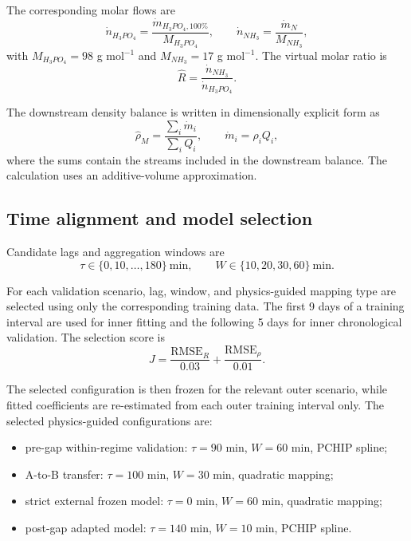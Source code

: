 \documentclass[11pt]{article}
\begin{document}
The corresponding molar flows are
\begin{equation}
\dot n_{H_3PO_4}=
\frac{\dot m_{H_3PO_4,100\%}}{M_{H_3PO_4}},
\qquad
\dot n_{NH_3}=
\frac{\dot m_N}{M_{NH_3}},
\end{equation}
with $M_{H_3PO_4}=98$ g mol$^{-1}$ and $M_{NH_3}=17$ g mol$^{-1}$. The virtual molar ratio is
\begin{equation}
\widehat R=
\frac{\dot n_{NH_3}}{\dot n_{H_3PO_4}}.
\end{equation}

The downstream density balance is written in dimensionally explicit form as
\begin{equation}
\widehat{\rho}_M=
\frac{\sum_i \dot m_i}{\sum_i Q_i},
\qquad
\dot m_i=\rho_iQ_i,
\end{equation}
where the sums contain the streams included in the downstream balance. The calculation uses an additive-volume approximation.

\subsection{Time alignment and model selection}

Candidate lags and aggregation windows are
\begin{equation}
\tau\in\{0,10,\ldots,180\}\ \mathrm{min},
\qquad
W\in\{10,20,30,60\}\ \mathrm{min}.
\end{equation}

For each validation scenario, lag, window, and physics-guided mapping type are selected using only the corresponding training data. The first 9 days of a training interval are used for inner fitting and the following 5 days for inner chronological validation. The selection score is
\begin{equation}
J=
\frac{\mathrm{RMSE}_R}{0.03}
+
\frac{\mathrm{RMSE}_{\rho}}{0.01}.
\end{equation}

The selected configuration is then frozen for the relevant outer scenario, while fitted coefficients are re-estimated from each outer training interval only. The selected physics-guided configurations are:
\begin{itemize}[leftmargin=1.5em]
\item pre-gap within-regime validation: $\tau=90$ min, $W=60$ min, PCHIP spline;
\item A-to-B transfer: $\tau=100$ min, $W=30$ min, quadratic mapping;
\item strict external frozen model: $\tau=0$ min, $W=60$ min, quadratic mapping;
\item post-gap adapted model: $\tau=140$ min, $W=10$ min, PCHIP spline.
\end{itemize}
\end{document}
